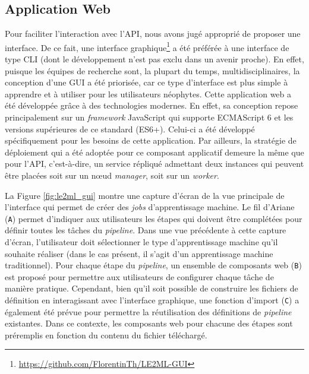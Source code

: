 \subsection{Application Web}

Pour faciliter l'interaction avec l'\acs{API}, nous avons jugé approprié de proposer une interface. De ce fait, une interface graphique\footnote{\url{https://github.com/FlorentinTh/LE2ML-GUI}} a été préférée à une interface de type \acs{CLI} (dont le développement n'est pas exclu dans un avenir proche). En effet, puisque les équipes de recherche sont, la plupart du temps, multidisciplinaires, la conception d'une \acs{GUI} a été priorisée, car ce type d'interface est plus simple à apprendre et à utiliser pour les utilisateurs néophytes. Cette application web a été développée grâce à des technologies modernes. En effet, sa conception repose principalement sur un \textit{framework} JavaScript qui supporte ECMAScript 6 et les versions supérieures de ce standard (ES6+). Celui-ci a été développé spécifiquement pour les besoins de cette application. Par ailleurs, la stratégie de déploiement qui a été adoptée pour ce composant applicatif demeure la même que pour l'\acs{API}, c'est-à-dire, un service répliqué admettant deux instances qui peuvent être placées soit sur un n\oe{}ud \textit{manager}, soit sur un \textit{worker}.

La Figure \ref{fig:le2ml_gui} montre une capture d'écran de la vue principale de l'interface qui permet de créer des \textit{jobs} d'apprentissage machine. Le fil d'Ariane (\texttt{A}) permet d'indiquer aux utilisateurs les étapes qui doivent être complétées pour définir toutes les tâches du \textit{pipeline}. Dans une vue précédente à cette capture d'écran, l'utilisateur doit sélectionner le type d'apprentissage machine qu'il souhaite réaliser (dans le cas présent, il s'agit d'un apprentissage machine traditionnel). Pour chaque étape du \textit{pipeline}, un ensemble de composants web (\texttt{B}) est proposé pour permettre aux utilisateurs de configurer chaque tâche de manière pratique. Cependant, bien qu'il soit possible de construire les fichiers de définition en interagissant avec l'interface graphique, une fonction d'import (\texttt{C}) a également été prévue pour permettre la réutilisation des définitions de \textit{pipeline} existantes. Dans ce contexte, les composants web pour chacune des étapes sont préremplis en fonction du contenu du fichier téléchargé.

